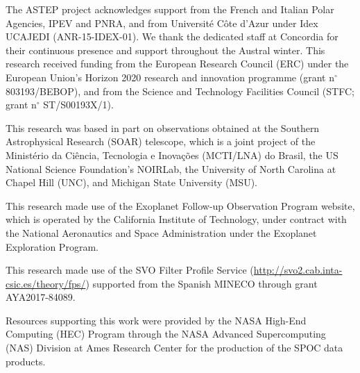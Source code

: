 \documentclass[12pt,twocolumn,tighten]{aastex63}
\begin{document}
The ASTEP project acknowledges support from the French and Italian
Polar Agencies, IPEV and PNRA, and from Universit\'e C\^ote d’Azur
under Idex UCAJEDI (ANR-15-IDEX-01). We thank the dedicated staff at
Concordia for their continuous presence and support throughout the
Austral winter.
%
This research received funding from the European Research Council
(ERC) under the European Union's Horizon 2020 research and innovation
programme (grant n$^\circ$ 803193/BEBOP), and from the
Science and Technology Facilities Council (STFC; grant n$^\circ$
ST/S00193X/1).
%
%

This research was based in part on observations obtained at the
Southern Astrophysical Research (SOAR) telescope, which is a joint
project of the Minist\'{e}rio da Ci\^{e}ncia, Tecnologia e
Inova\c{c}\~{o}es (MCTI/LNA) do Brasil, the US National Science
Foundation’s NOIRLab, the University of North Carolina at Chapel Hill
(UNC), and Michigan State University (MSU).

This research made use of the Exoplanet Follow-up Observation
Program website, which is operated by the California Institute of
Technology, under contract with the National Aeronautics and Space
Administration under the Exoplanet Exploration Program.

This research made use of the SVO Filter Profile Service
(\url{http://svo2.cab.inta-csic.es/theory/fps/}) supported from the Spanish
MINECO through grant AYA2017-84089.

Resources supporting this work were provided by the NASA High-End
Computing (HEC) Program through the NASA Advanced Supercomputing (NAS)
Division at Ames Research Center for the production of the SPOC data
products.
%
\end{document}
